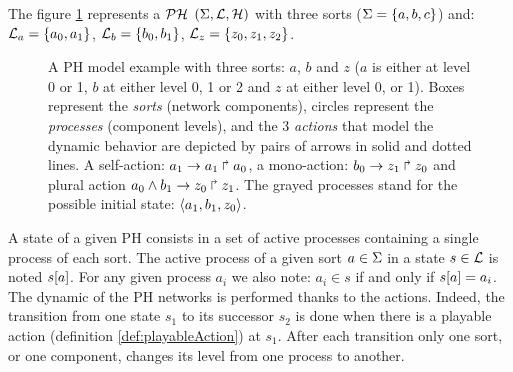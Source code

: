 \begin{example}
The figure \ref{fig:ph} represents a $\mathcal{PH}$ $(\Sigma,\mathcal{L},\mathcal{H})$ with three sorts
($\Sigma = \{a, b, c\}$) and:
$\mathcal{L}_a = \{a_0, a_1\}$,
$\mathcal{L}_b = \{b_0, b_1\}$,
$\mathcal{L}_z = \{z_0, z_1, z_2\}$.
\begin{figure}[ht]
\label{fig:ph} 
\centering
{}
\caption{
A PH model example with three sorts: $a$, $b$ and $z$ ($a$ is either at level 0 or 1, $b$ at either level 0, 1 or 2 and $z$ at either level 0, or 1). Boxes represent the \emph{sorts} (network components), circles represent the \emph{processes} (component levels), and the 3 \emph{actions} that model the dynamic behavior are depicted by pairs of arrows in solid and dotted lines. A self-action:  $a_1\rightarrow a_1\Rsh a_0$, a mono-action:  $b_0\rightarrow z_1\Rsh z_0$ and plural action  $a_0 \wedge b_1\rightarrow z_0\Rsh z_1$.  The grayed processes stand for the possible initial state: $\mbox{$\langle a_1, b_1, z_0 \rangle$}$.
}
\end{figure}
\end{example}
A state of a given PH consists in a set of active processes containing a single process of each sort.
The active process of a given sort $a \in \Sigma$ in a state $s \in \mathcal{L}$
is noted ${s[a]}$.
For any given process $a_i$ we also note: $a_i \in s$ if and only if ${s[a]} = a_i$. The dynamic of the PH networks is performed thanks to the actions. Indeed, the transition from one state $s_1$ to its successor $s_2$ is done when there is a playable action (definition \ref{def:playableAction}) at $s_1$. After each transition only one sort, or one component, changes its level from one process to another.
%

